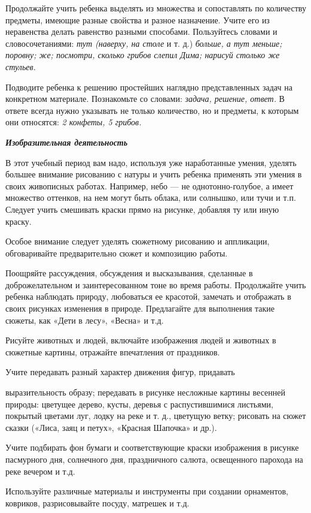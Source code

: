 \documentclass[a5paper]{book}
\renewcommand{\emph}[1]{\textit{#1}}
\begin{document}
Продолжайте учить ребенка выделять из множества и сопоставлять по
количеству предметы, имеющие разные свойства и разное назначение. Учите
его из неравенства делать равенство разными способами. Пользуйтесь
словами и словосочетаниями: \emph{тут (наверху, на столе} и т. д.)
\emph{больше, а тут меньше; поровну; же; посмотри, сколько грибов слепил
Дима; нарисуй столько же стульев.}

Подводите ребенка к решению простейших наглядно представленных задач на
конкретном материале. Познакомьте со словами: \emph{задача, решение,
ответ.} В ответе всегда нужно указывать не только количество, но и
предметы, к которым они относятся: \emph{2 конфеты, 5 грибов.}

\emph{\textbf{Изобразительная деятельность}}

В этот учебный период вам надо, используя уже наработанные умения,
уделять большее внимание рисованию с натуры и учить ребенка применять
эти умения в своих живописных работах. Например, небо --- не
однотонно-голубое, а имеет множество оттенков, на нем могут быть облака,
или солнышко, или тучи и т.п. Следует учить смешивать краски прямо на
рисунке, добавляя ту или иную краску.

Особое внимание следует уделять сюжетному рисованию и аппликации,
обговаривайте предварительно сюжет и композицию работы.

Поощряйте рассуждения, обсуждения и высказывания, сделанные в
доброжелательном и заинтересованном тоне во время работы. Продолжайте
учить ребенка наблюдать природу, любоваться ее красотой, замечать и
отображать в своих рисунках изменения в природе. Предлагайте для
выполнения такие сюжеты, как «Дети в лесу», «Весна» и т.д.

Рисуйте животных и людей, включайте изображения людей и животных в
сюжетные картины, отражайте впечатления от праздников.

Учите передавать разный характер движения фигур, придавать

выразительность образу; передавать в рисунке несложные картины весенней
природы: цветущее дерево, кусты, деревья с распустившимися листьями,
покрытый цветами луг, лодку на реке и т. д., цветущую ветку; рисовать на
сюжет сказки («Лиса, заяц и петух», «Красная Шапочка» и др.).

Учите подбирать фон бумаги и соответствующие краски изображения в
рисунке пасмурного дня, солнечного дня, праздничного салюта, освещенного
парохода на реке вечером и т.д.

Используйте различные материалы и инструменты при создании орнаментов,
ковриков, разрисовывайте посуду, матрешек и т.д.
\end{document}
